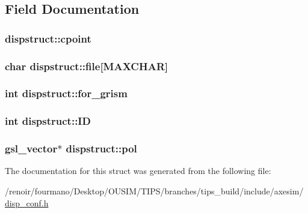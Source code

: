 \subsection{Field Documentation}
\hypertarget{structdispstruct_afec7c60794164585d3c86f3e588f3060}{
\subsubsection[{cpoint}]{ {\bf dispstruct::cpoint}}}
\label{structdispstruct_afec7c60794164585d3c86f3e588f3060}
\hypertarget{structdispstruct_ae198a71887c5bcde0adfea06f0c721ad}{
\subsubsection[{file}]{\setlength{\rightskip}{0pt plus 5cm}char {\bf dispstruct::file}\mbox{[}MAXCHAR\mbox{]}}}
\label{structdispstruct_ae198a71887c5bcde0adfea06f0c721ad}
\hypertarget{structdispstruct_ac05fe270c9ee7b243421a69226068ee9}{
\subsubsection[{for\_\-grism}]{\setlength{\rightskip}{0pt plus 5cm}int {\bf dispstruct::for\_\-grism}}}
\label{structdispstruct_ac05fe270c9ee7b243421a69226068ee9}
\hypertarget{structdispstruct_a2733c14f8bb3ad51ceb8dc526dc9b426}{
\subsubsection[{ID}]{\setlength{\rightskip}{0pt plus 5cm}int {\bf dispstruct::ID}}}
\label{structdispstruct_a2733c14f8bb3ad51ceb8dc526dc9b426}
\hypertarget{structdispstruct_aa3d9b87899d74411311e3a0ab60eeb20}{
\subsubsection[{pol}]{\setlength{\rightskip}{0pt plus 5cm}gsl\_\-vector$\ast$ {\bf dispstruct::pol}}}
\label{structdispstruct_aa3d9b87899d74411311e3a0ab60eeb20}


The documentation for this struct was generated from the following file:\begin{DoxyCompactItemize}
\item 
/renoir/fourmano/Desktop/OUSIM/TIPS/branches/tips\_\-build/include/axesim/\hyperlink{disp__conf_8h}{disp\_\-conf.h}\end{DoxyCompactItemize}
